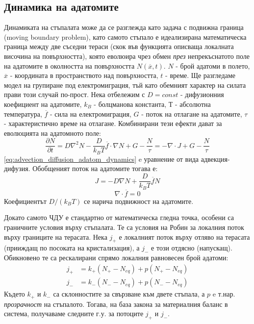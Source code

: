 \subsection{Динамика на адатомите}
Динамиката на стъпалата може да се разглежда като задача с подвижна граница (moving boundary problem), като самото стъпало е идеализирана математическа граница между две съседни тераси (скок във функцията описваща локалната височина на повърхността), която еволюира чрез обмен \textit{през} непрекъснатото поле на адатомите в околността на повърхността $N(\overline{x}, t)$. $N$ - брой адатоми в полето, $\overline{x}$ - координата в пространството над повърхността, $t$ - време. \cite{Krug2005} Ще разгледаме модел на групиране под електромиграция, тъй като обемният характер на силата прави този случай по-прост.
Нека отбележим с $D = const$ - дифузионния коефициент на адатомите, $k_B$ - болцманова константа, $Т$ - абсолютна температура, $\overline{f}$ - сила на електромиграция, $G$ - поток на отлагане на адатомите, $\tau$ - характеристично време на отлагане. Комбинирани тези ефекти дават за еволюцията на адатомното поле:
\begin{equation}
	\label{eq:advection_diffusion_adatom_dynamics}
	\frac{\partial N}{\partial t} = D \nabla^2 N - \frac{D}{k_B T} \overline{f} \cdot \nabla N + G - \frac{N}{\tau} = - \nabla \cdot J + G - \frac{N}{\tau}
\end{equation}
\autoref{eq:advection_diffusion_adatom_dynamics} e уравнение от вида адвекция-дифузия. Обобщеният поток на адатомите тогава е:
\begin{equation*}
	J = -D \nabla N + \frac{D}{k_{B} T} \overline{f} N
\end{equation*}
\begin{equation*}
	\nabla \cdot \overline{f} = 0
\end{equation*}
Коефициентът $D/(k_{B} T)$ се нарича подвижност на адатомите. 

Докато самото ЧДУ е стандартно от математическа гледна точка, особени са граничните условия върху стъпалата. Те са условия на Робин за локалния поток върху границите на терасата. Нека $j_+$ е локалният поток върху отляво на терасата (прииждащ по посоката на кристализация), а $j_-$ е този отдясно (напускащ). Обикновено те са рескалирани спрямо локалния равновесен брой адатоми:
\begin{align*}
	j_+ &= k_+ (N_+ - N_{eq}) + p (N_+ - N_{eq}) \\
	j_- &= k_- (N_- - N_{eq}) + p (N_- - N_{eq}) 
\end{align*}
Където $k_+$ и $k_-$ са склонностите за свързване към двете стъпала, а $p$ e т.нар. \textit{прозрачност} на стъпалото. Тогава, на база закона за материалния баланс в система, получаваме следните г.у. за потоците $j_+$ и $j_-$.

